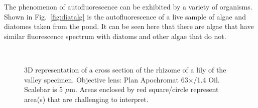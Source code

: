 The phenomenon of autofluorescence can be exhibited by a variety of organisms. 
Shown in Fig.~\ref{fig:diatalg} is the autofluorescence of a live sample of algae and diatomes taken from the pond. 
It can be seen here that there are algae that have similar fluorescence spectrum with diatoms and other algae that do not.

\begin{figure}[h!]
\centering
\captionsetup[subfigure]{position=top}
\hspace{0.1em}
\vspace{-0.6em}
\captionsetup[subfigure]{position=bottom}
	\hspace{0.1em}
\\
\caption{3D representation of a cross section of the rhizome of a lily of the valley specimen. 
Objective lens: Plan Apochromat 63$\times$/1.4 Oil. 
Scalebar is 5 $\mu$m. 
Areas enclosed by red square/circle represent area(s) that are challenging to interpret.} 
\label{fig:3drep}
\end{figure}


